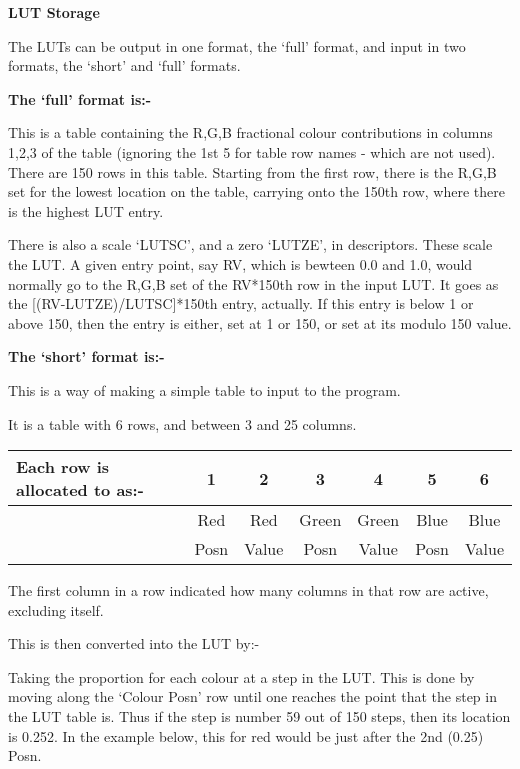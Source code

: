 \begin{small}
{{\vspace*{1mm}
{\bf LUT Storage}
\vspace*{1mm}

  The LUTs can be output in one format, the `full' format, and input
  in two formats, the `short' and `full' formats.

  {\bf The `full' format is:-}

  This is a table containing the R,G,B fractional colour contributions
  in columns 1,2,3 of the table (ignoring the 1st 5 for table row
  names - which are not used). There are 150 rows in this table.
  Starting from the first row, there is the R,G,B set for the lowest
  location on the table, carrying onto the 150th row, where there is
  the highest LUT entry.

  There is also a scale `LUTSC', and a zero `LUTZE', in descriptors.
  These scale the LUT. A given entry point, say RV, which is
  bewteen 0.0 and 1.0, would normally go to the R,G,B set of the
  RV*150th row in the input LUT. It goes as
  the [(RV-LUTZE)/LUTSC]*150th entry, actually. If this entry is below 1 or
  above 150, then the entry is either, set at 1 or 150, or set at
  its modulo 150 value.

  {\bf The `short' format is:-}

  This is a way of making a simple table to input to the program.

  It is a table with 6 rows, and between 3 and 25 columns.

\begin{tabular}{|l|c|c|c|c|c|c|} \hline
  Each row is allocated to as:- &1      &2      &3       &4
                                &5      &6 \\ \hline
                                &  Red &  Red  & Green &  Green&   Blue
                                &  Blue \\
                               & Posn & Value &  Posn &  Value &  Posn &
                               Value \\ \hline
\end{tabular}

  The first column in a row indicated how many columns in that row are
  active, excluding itself.

  This is then converted into the LUT by:-

  Taking the proportion for each colour at a step in the LUT. This
     is done by moving along the `Colour Posn' row until one reaches
     the point that the step in the LUT table is. Thus if the step is
     number 59 out of 150 steps, then its location is 0.252. In the
     example below, this for red would be just after the 2nd (0.25)
     Posn.

}}
\end{small}
